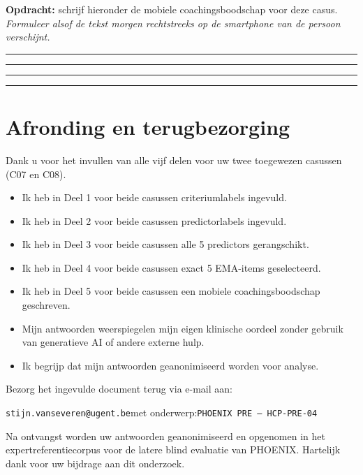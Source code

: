\documentclass[11pt,a4paper]{article}
\newcommand{\writeline}{\vspace{0.22em}\noindent\rule{\linewidth}{0.25pt}\vspace{0.42em}\par}
\newcommand{\messagelines}{\writeline\writeline\writeline\writeline}
\begin{document}
\begin{responsebox}
\small\textbf{Opdracht:} schrijf hieronder de mobiele coachingsboodschap voor deze casus.
\textit{Formuleer alsof de tekst morgen rechtstreeks op de smartphone van de persoon verschijnt.}

\messagelines
\end{responsebox}

\vspace{0.6em}
\newpage


\section{Afronding en terugbezorging}

Dank u voor het invullen van alle vijf delen voor uw twee toegewezen casussen
(C07 en C08).

\begin{instrbox}[title=Checklist voor terugbezorging]
\begin{itemize}
\item[$\square$] Ik heb in Deel 1 voor beide casussen criteriumlabels ingevuld.
\item[$\square$] Ik heb in Deel 2 voor beide casussen predictorlabels ingevuld.
\item[$\square$] Ik heb in Deel 3 voor beide casussen alle 5 predictors gerangschikt.
\item[$\square$] Ik heb in Deel 4 voor beide casussen exact 5 EMA-items geselecteerd.
\item[$\square$] Ik heb in Deel 5 voor beide casussen een mobiele coachingsboodschap geschreven.
\item[$\square$] Mijn antwoorden weerspiegelen mijn eigen klinische oordeel zonder gebruik van generatieve AI of andere externe hulp.
\item[$\square$] Ik begrijp dat mijn antwoorden geanonimiseerd worden voor analyse.
\end{itemize}
\end{instrbox}

\medskip
Bezorg het ingevulde document terug via e-mail aan:
\begin{center}
\texttt{stijn.vanseveren@ugent.be}\quad met onderwerp:\quad \texttt{PHOENIX PRE --- HCP-PRE-04}
\end{center}

\vspace{0.5em}
\begin{tcolorbox}[colback=AccentBlue,colframe=PrimaryBlue,arc=2mm,boxrule=0.6pt,left=8pt,right=8pt,top=7pt,bottom=7pt]
\small\centering
Na ontvangst worden uw antwoorden geanonimiseerd en opgenomen in het expertreferentiecorpus
voor de latere blind evaluatie van PHOENIX. Hartelijk dank voor uw bijdrage aan dit onderzoek.
\end{tcolorbox}
\end{document}
